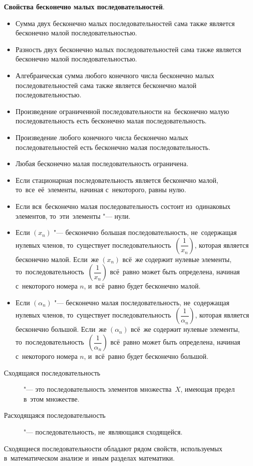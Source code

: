 \documentclass[]{scrartcl}
\begin{document}
{{\textbf{Свойства бесконечно малых последовательностей}.
\begin{itemize}
	\item Сумма двух бесконечно малых последовательностей сама также является бесконечно малой последовательностью.
	\item Разность двух бесконечно малых последовательностей сама также является бесконечно малой последовательностью.
	\item Алгебраическая сумма любого конечного числа бесконечно малых последовательностей сама также является бесконечно малой последовательностью.
	\item Произведение ограниченной последовательности на~бесконечно малую последовательность есть бесконечно малая последовательность.
	\item Произведение любого конечного числа бесконечно малых последовательностей есть бесконечно малая последовательность.
	\item Любая бесконечно малая последовательность ограничена.
	\item Если стационарная последовательность является бесконечно малой, то~все~её~элементы, начиная с~некоторого, равны нулю.
	\item Если вся~бесконечно малая последовательность состоит из~одинаковых элементов, то~эти~элементы "--- нули.
	\item Если ${\textstyle (x_{n})}$ "--- бесконечно большая последовательность, не~содержащая нулевых членов, то~существует последовательность~${\textstyle (\dfrac{1}{x_n})}$, которая является бесконечно малой. Если~же ${\textstyle (x_{n})}$ всё~же содержит нулевые элементы, то~последовательность~${\textstyle (\dfrac{1}{x_n})}$ всё~равно может быть определена, начиная с~некоторого номера ${\textstyle n}$, и~всё~равно будет бесконечно малой.
	\item Если ${\textstyle (\alpha_{n})}$ "--- бесконечно малая последовательность, не~содержащая нулевых членов, то~существует последовательность~${\textstyle (\dfrac{1}{\alpha_n})}$, которая является бесконечно большой. Если~же ${\textstyle (\alpha_{n})}$ всё~же содержит нулевые элементы, то~последовательность~${\textstyle (\dfrac{1}{\alpha_n})}$ всё~равно может быть определена, начиная с~некоторого номера ${\textstyle n}$, и~всё~равно будет бесконечно большой.
\end{itemize}

\begin{description}
	\item[Сходящаяся последовательность] "--- это последовательность элементов множества~${\textstyle X}$, имеющая предел в~этом множестве.
	\item[Расходящаяся последовательность] "--- последовательность, не~являющаяся сходящейся.
\end{description}
Сходящиеся последовательности обладают рядом свойств, используемых в~математическом анализе и~иным разделах математики.

}}
\end{document}
